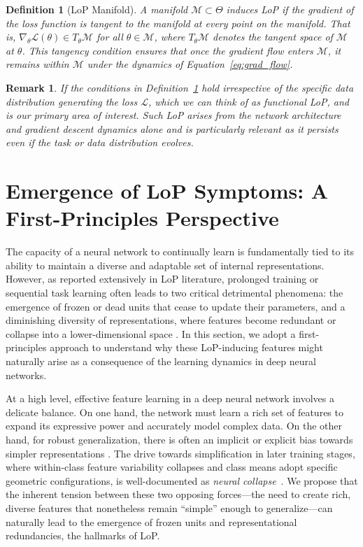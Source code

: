 \documentclass{article}
\newcommand{\Loss}{\mathcal{L}}
\newtheorem{definition}{Definition}[section]
\newtheorem{remark}{Remark}[section]
\numberwithin{figure}{section}
\begin{document}
\begin{definition}[LoP Manifold]
\label{def:lop}
A manifold $\mathcal{M}\subset\Theta$ induces LoP if the gradient of the loss function is tangent to the manifold at every point on the manifold. That is, $\nabla_\theta\Loss(\theta)\in T_\theta\mathcal{M}$ for all $\theta\in\mathcal{M}$, where $T_\theta\mathcal{M}$ denotes the tangent space of $\mathcal{M}$ at $\theta$. This tangency condition ensures that once the gradient flow enters $\mathcal{M}$, it remains within $\mathcal{M}$ under the dynamics of Equation~\ref{eq:grad_flow}.
\end{definition}


\begin{remark}
If the conditions in Definition~\ref{def:lop} hold irrespective of the specific data distribution generating the loss $\Loss$, which we can think of as functional LoP, and is our primary area of interest. Such LoP arises from the network architecture and gradient descent dynamics alone and is particularly relevant as it persists even if the task or data distribution evolves.
\end{remark}



\section{Emergence of LoP Symptoms: A First-Principles Perspective}
\label{sec:emergence_lop}
\label{sec:emergence_lop_first_principles}

The capacity of a neural network to continually learn is fundamentally tied to its ability to maintain a diverse and adaptable set of internal representations. However, as reported extensively in LoP literature, prolonged training or sequential task learning often leads to two critical detrimental phenomena: the emergence of frozen or dead units that cease to update their parameters, and a diminishing diversity of representations, where features become redundant or collapse into a lower-dimensional space \citep{dohare2021continual, lyle2022understanding, nikishin2022primacy}. In this section, we adopt a first-principles approach to understand why these LoP-inducing features might naturally arise as a consequence of the learning dynamics in deep neural networks.

At a high level, effective feature learning in a deep neural network involves a delicate balance. On one hand, the network must learn a rich set of features to expand its expressive power and accurately model complex data. On the other hand, for robust generalization, there is often an implicit or explicit bias towards simpler representations \citep{valle2018deep, zhang2017understanding}. The drive towards simplification in later training stages, where within-class feature variability collapses and class means adopt specific geometric configurations, is well-documented as \emph{neural collapse}~\citep{papyan2020prevalence}. We propose that the inherent tension between these two opposing forces---the need to create rich, diverse features that nonetheless remain ``simple'' enough to generalize---can naturally lead to the emergence of frozen units and representational redundancies, the hallmarks of LoP.
\end{document}
